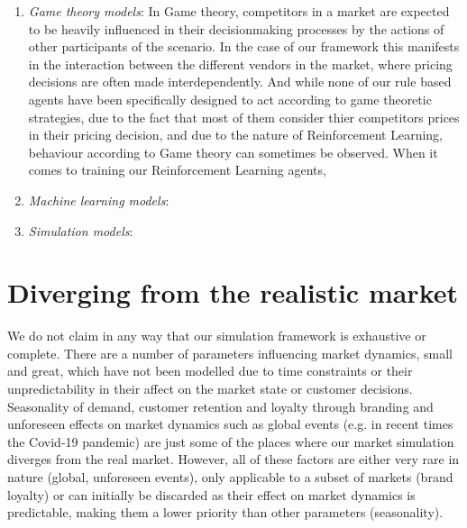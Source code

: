 \begin{enumerate}
	\item \emph{Game theory models}: \label{bullet:GameTheory}In Game theory, competitors in a market are expected to be heavily influenced in their decisionmaking processes by the actions of other participants of the scenario.  In the case of our framework this manifests in the interaction between the different vendors in the market, where pricing decisions are often made interdependently. And while none of our rule based agents have been specifically designed to act according to game theoretic strategies, due to the fact that most of them consider thier competitors prices in their pricing decision, and due to the nature of Reinforcement Learning, behaviour according to Game theory can sometimes be observed.  When it comes to training our Reinforcement Learning agents,

	\item \emph{Machine learning models}:

	\item \emph{Simulation models}:
\end{enumerate}


\section{Diverging from the realistic market}

We do not claim in any way that our simulation framework is exhaustive or complete. There are a number of parameters influencing market dynamics, small and great, which have not been modelled due to time constraints or their unpredictability in their affect on the market state or customer decisions. Seasonality of demand, customer retention and loyalty through branding and unforeseen effects on market dynamics such as global events (e.g. in recent times the Covid-19 pandemic) are just some of the places where our market simulation diverges from the real market. However, all of these factors are either very rare in nature (global, unforeseen events), only applicable to a subset of markets (brand loyalty) or can initially be discarded as their effect on market dynamics is predictable, making them a lower priority than other parameters (seasonality).
